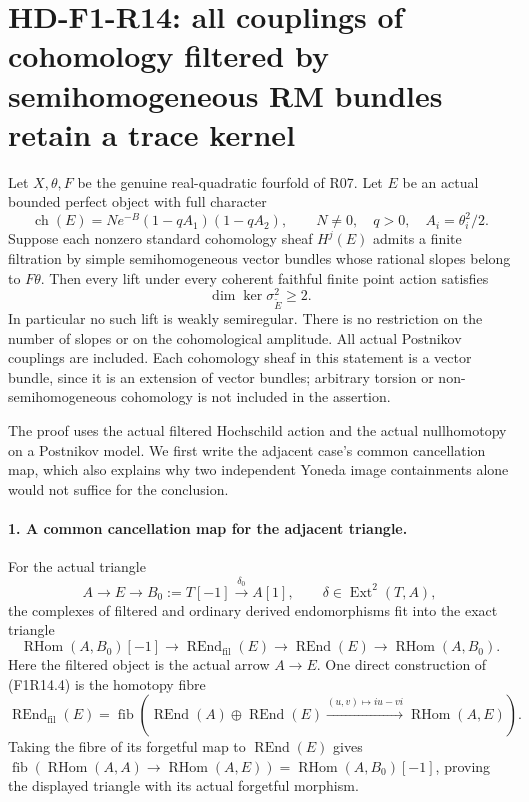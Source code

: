 \section{HD-F1-R14: all couplings of cohomology filtered by semihomogeneous RM bundles retain a trace kernel}
\label{sec:followup-rm-filtered-semihomogeneous}

Let $X,\theta,F$ be the genuine real-quadratic fourfold of
R07. Let $E$ be an actual bounded perfect object with full
character
\[
 \operatorname{ch}(E)=N e^{-B}(1-qA_1)(1-qA_2),
 \qquad N\ne0,\quad q>0,
 \quad A_i=\theta_i^2/2.
 \tag{F1R14.1}
\]
Suppose each nonzero standard cohomology sheaf $H^j(E)$
admits a finite filtration by simple semihomogeneous vector
bundles whose rational slopes belong to $F\theta$.
Then every lift under every coherent faithful finite point
action satisfies
\[
                       \dim\ker\sigma^2_{\widetilde E}\ge2.
 \tag{F1R14.2}
\]
In particular no such lift is weakly semiregular.
There is no restriction on the number of slopes or on the
cohomological amplitude. All actual Postnikov couplings are
included. Each cohomology sheaf in this statement is a
vector bundle, since it is an extension of vector bundles;
arbitrary torsion or non-semihomogeneous cohomology is not
included in the assertion.

The proof uses the actual filtered Hochschild action and
the actual nullhomotopy on a Postnikov model. We first
write the adjacent case's common cancellation map, which
also explains why two independent Yoneda image containments
alone would not suffice for the conclusion.

\paragraph{1. A common cancellation map for the adjacent triangle.}
For the actual triangle
\[
 A\longrightarrow E\longrightarrow B_0:=T[-1]
      \xrightarrow{\delta_0}A[1],\qquad
                  \delta\in\operatorname{Ext}^2(T,A),
 \tag{F1R14.3}
\]
the complexes of filtered and ordinary derived endomorphisms
fit into the exact triangle
\[
 \operatorname{RHom}(A,B_0)[-1]\longrightarrow
 \operatorname{REnd}_{\mathrm{fil}}(E)\longrightarrow
 \operatorname{REnd}(E)\longrightarrow
                         \operatorname{RHom}(A,B_0).
 \tag{F1R14.4}
\]
Here the filtered object is the actual arrow $A\to E$.
One direct construction of (F1R14.4) is the homotopy fibre
\[
 \operatorname{REnd}_{\mathrm{fil}}(E)
 =\operatorname{fib}\left(
 \operatorname{REnd}(A)\oplus\operatorname{REnd}(E)
 \xrightarrow{(u,v)\mapsto i u-v i}
                         \operatorname{RHom}(A,E)\right).
\]
Taking the fibre of its forgetful map to
$\operatorname{REnd}(E)$ gives
$\operatorname{fib}(\operatorname{RHom}(A,A)
\to\operatorname{RHom}(A,E))
=\operatorname{RHom}(A,B_0)[-1]$, proving the displayed
triangle with its actual forgetful morphism.

